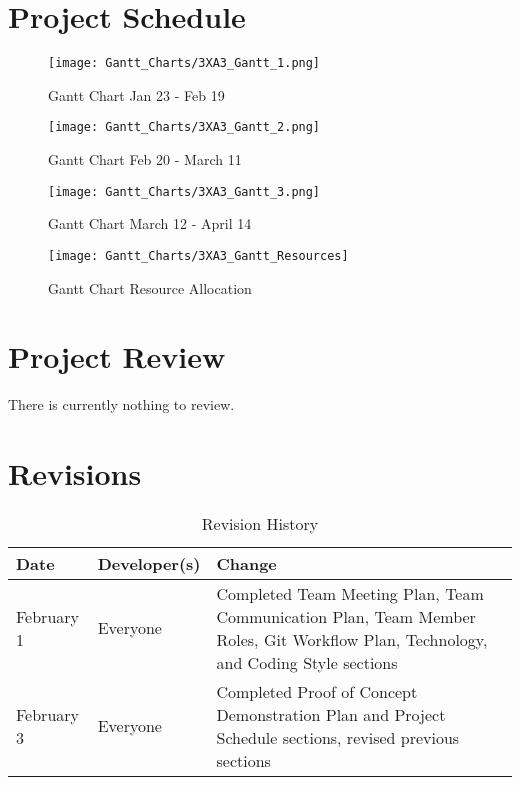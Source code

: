 \documentclass{article}
\begin{document}
\section{Project Schedule}

\begin{figure}[htp]
    \centering
    \texttt{[image: Gantt\_Charts/3XA3\_Gantt\_1.png]}
    \caption{Gantt Chart Jan 23 - Feb 19}
    \label{fig:gantt0}
\end{figure}

\begin{figure}[htp]
    \centering
    \texttt{[image: Gantt\_Charts/3XA3\_Gantt\_2.png]}
    \caption{Gantt Chart Feb 20 - March 11}
    \label{fig:gantt1}
\end{figure}

\begin{figure}[htp]
    \centering
    \texttt{[image: Gantt\_Charts/3XA3\_Gantt\_3.png]}
    \caption{Gantt Chart March 12 - April 14}
    \label{fig:gantt2}
\end{figure}

\begin{figure}[htp]
    \centering
    \texttt{[image: Gantt\_Charts/3XA3\_Gantt\_Resources]}
    \caption{Gantt Chart Resource Allocation} 
    \label{fig:gantt_resource}
\end{figure}

\clearpage

\section{Project Review}

There is currently nothing to review.

\newpage

\section{Revisions}

\begin{table}[hp]
\caption{Revision History} \label{TblRevisionHistory}
\begin{tabularx}{\textwidth}{llX}
\toprule
\textbf{Date} & \textbf{Developer(s)} & \textbf{Change}\\
\midrule
February 1 & Everyone & Completed Team Meeting Plan, Team Communication Plan, Team Member Roles, Git Workflow Plan, Technology, and Coding Style sections \\
February 3 & Everyone & Completed Proof of Concept Demonstration Plan and Project Schedule sections, revised previous sections \\ 
\bottomrule
\end{tabularx}
\end{table}
\end{document}
